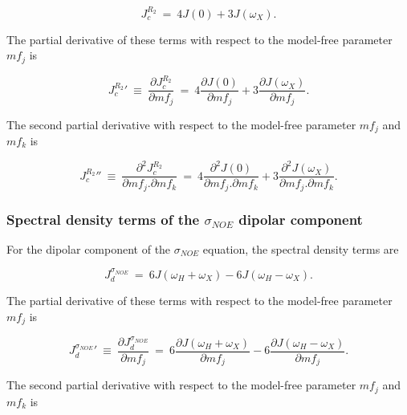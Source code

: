 \begin{equation}
    J_c^{R_2} \ = \ 4J(0) + 3J(\omega_X).  \label{eq: J terms: JR2c}
\end{equation}

\noindent The partial derivative of these terms with respect to the model-free parameter $mf_j$ is

\begin{equation}
    {J_c^{R_2}}' \ \equiv \ \frac{\partial J_c^{R_2}}{\partial mf_j}
        \ = \ 4 \frac{\partial J(0)}{\partial mf_j}
        + 3 \frac{\partial J(\omega_X)}{\partial mf_j}.  \label{eq: J terms: JR2c'}
\end{equation}

\noindent The second partial derivative with respect to the model-free parameter $mf_j$ and $mf_k$ is

\begin{equation}
    {J_c^{R_2}}'' \ \equiv \ \frac{\partial^2 J_c^{R_2}}{\partial mf_j . \partial mf_k}
        \ = \ 4 \frac{\partial^2 J(0)}{\partial mf_j . \partial mf_k}
        + 3 \frac{\partial^2 J(\omega_X)}{\partial mf_j . \partial mf_k}.  \label{eq: J terms: JR2c"}
\end{equation}


\subsubsection{Spectral density terms of the $\sigma_{NOE}$ dipolar component}

For the dipolar component of the $\sigma_{NOE}$ equation, the spectral density terms are

\begin{equation}
    J_d^{\sigma_{NOE}} \ = \ 6J(\omega_H + \omega_X) - 6J(\omega_H - \omega_X).  \label{eq: J terms: JsigmaNOEd}
\end{equation}

\noindent The partial derivative of these terms with respect to the model-free parameter $mf_j$ is

\begin{equation}
    {J_d^{\sigma_{NOE}}}' \ \equiv \ \frac{\partial J_d^{\sigma_{NOE}}}{\partial mf_j}
        \ = \ 6 \frac{\partial J(\omega_H + \omega_X)}{\partial mf_j}
        - 6 \frac{\partial J(\omega_H - \omega_X)}{\partial mf_j}.  \label{eq: J terms: JsigmaNOEd'}
\end{equation}

\noindent The second partial derivative with respect to the model-free parameter $mf_j$ and $mf_k$ is

